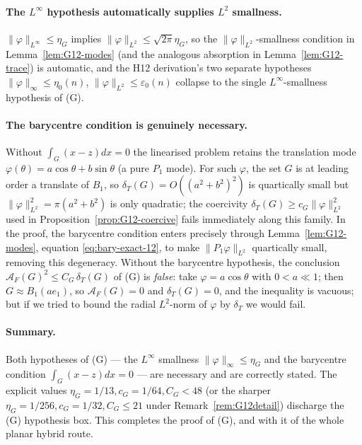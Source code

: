 \documentclass[11pt]{amsart}
\newcommand{\dT}{\delta_T}
\newcommand{\AF}{\mathcal A_F}
\newcommand{\eps}{\varepsilon}
\begin{document}
\paragraph{The \(L^\infty\) hypothesis automatically supplies \(L^2\)
smallness.}
\(\|\varphi\|_{L^\infty}\le\eta_G\) implies
\(\|\varphi\|_{L^2}\le\sqrt{2\pi}\eta_G\), so the
\(\|\varphi\|_{L^2}\)-smallness condition in
Lemma~\ref{lem:G12-modes} (and the analogous absorption in
Lemma~\ref{lem:G12-trace}) is automatic, and the H12 derivation's
two separate hypotheses
\(\|\varphi\|_\infty\le\eta_0(n)\), \(\|\varphi\|_{L^2}\le\eps_0(n)\)
collapse to the single \(L^\infty\)-smallness hypothesis of (G).

\paragraph{The barycentre condition is genuinely necessary.}
Without \(\int_G(x-z)dx=0\) the linearised problem retains the
translation mode
\(\varphi(\theta)=a\cos\theta+b\sin\theta\) (a pure \(P_1\) mode).
For such \(\varphi\), the set \(G\) is at leading order a translate
of \(B_1\), so \(\dT(G)=O((a^2+b^2)^2)\) is quartically small but
\(\|\varphi\|_{L^2}^2=\pi(a^2+b^2)\) is only quadratic; the
coercivity \(\dT(G)\ge c_G\|\varphi\|_{L^2}^2\) used in
Proposition~\ref{prop:G12-coercive} fails immediately along this
family.  In the proof, the barycentre condition enters precisely
through Lemma~\ref{lem:G12-modes}, equation
\eqref{eq:bary-exact-12}, to make
\(\|P_1\varphi\|_{L^2}\) quartically small, removing this
degeneracy.  Without the barycentre hypothesis, the conclusion
\(\AF(G)^2\le C_G\,\dT(G)\) of (G) is \emph{false}: take
\(\varphi=a\cos\theta\) with \(0<a\ll 1\); then
\(G\approx B_1(a e_1)\), so \(\AF(G)=0\) and \(\dT(G)=0\), and the
inequality is vacuous; but if we tried to bound the radial
\(L^2\)-norm of \(\varphi\) by \(\dT\) we would fail.

\paragraph{Summary.}
Both hypotheses of (G) --- the \(L^\infty\) smallness
\(\|\varphi\|_\infty\le\eta_G\) and the barycentre condition
\(\int_G(x-z)dx=0\) --- are necessary and are correctly stated.
The explicit values
\(\eta_G=1/13,c_G=1/64,C_G<48\) (or the sharper
\(\eta_G=1/256,c_G=1/32,C_G\le 21\) under Remark~\ref{rem:G12detail})
discharge the (G) hypothesis box.  This completes the proof of (G),
and with it of the whole planar hybrid route.
\end{document}
